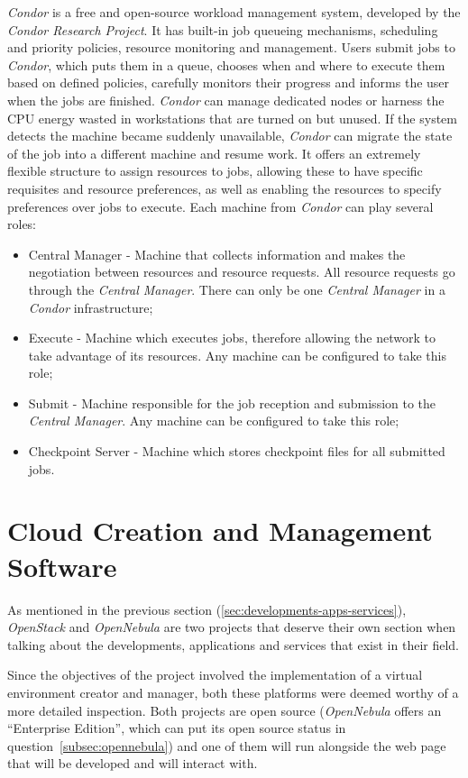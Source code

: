 \textit{Condor} is a free and open-source workload management system, developed by the \textit{Condor Research Project}.
It has built-in job queueing mechanisms, scheduling and priority policies, resource monitoring and management. Users submit jobs to \textit{Condor}, which puts them in a queue, chooses when and where to execute them based on defined policies, carefully monitors their progress and informs the user when the jobs are finished.
\textit{Condor} can manage dedicated nodes or harness the CPU energy wasted in workstations that are turned on but unused. If the system detects the machine became suddenly unavailable, \textit{Condor} can migrate the state of the job into a different machine and resume work. 
It offers an extremely flexible structure to assign resources to jobs, allowing these to have specific requisites and resource preferences, as well as enabling the resources to specify preferences over jobs to execute.
Each machine from \textit{Condor} can play several roles:
\begin{itemize}
\item Central Manager - Machine that collects information and makes the negotiation between resources and resource requests. All resource requests go through the \textit{Central Manager}. There can only be one \textit{Central Manager} in a \textit{Condor} infrastructure;
\item Execute - Machine which executes jobs, therefore allowing the network to take advantage of its resources. Any machine can be configured to take this role;
\item Submit - Machine responsible for the job reception and submission to the \textit{Central Manager}. Any machine can be configured to take this role;
\item Checkpoint Server - Machine which stores checkpoint files for all submitted jobs.\cite{jorge-ruao,condor}
\end{itemize}


\section{Cloud Creation and Management Software}\label{sec:stack-nebula}

As mentioned in the previous section (\ref{sec:developments-apps-services}), \textit{OpenStack} and \textit{OpenNebula} are two projects that deserve their own section when talking about the developments, applications and services that exist in their field. 

Since the objectives of the project involved the implementation of a virtual environment creator and manager, both these platforms were deemed worthy of a more detailed inspection. Both projects are open source (\textit{OpenNebula} offers an ``Enterprise Edition'', which can put its open source status in question~\ref{subsec:opennebula}) and one of them will run alongside the web page that will be developed and will interact with.


